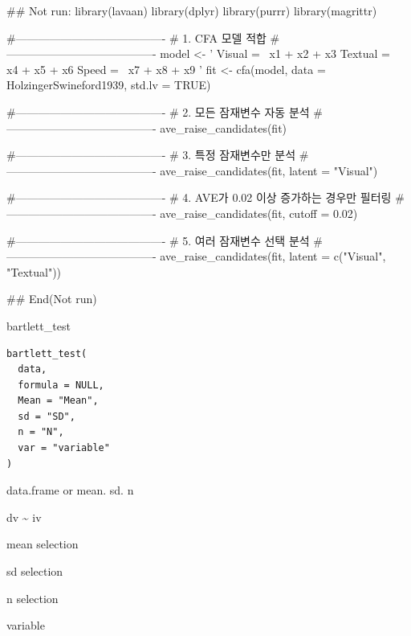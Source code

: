 \documentclass[a4paper]{book}
\begin{document}
\begin{Examples}
\begin{ExampleCode}
## Not run: 
library(lavaan)
library(dplyr)
library(purrr)
library(magrittr)

#----------------------------------------
# 1. CFA 모델 적합
#----------------------------------------
model <- '
  Visual  =~ x1 + x2 + x3
  Textual =~ x4 + x5 + x6
  Speed   =~ x7 + x8 + x9
'
fit <- cfa(model, data = HolzingerSwineford1939, std.lv = TRUE)

#----------------------------------------
# 2. 모든 잠재변수 자동 분석
#----------------------------------------
ave_raise_candidates(fit)

#----------------------------------------
# 3. 특정 잠재변수만 분석
#----------------------------------------
ave_raise_candidates(fit, latent = "Visual")

#----------------------------------------
# 4. AVE가 0.02 이상 증가하는 경우만 필터링
#----------------------------------------
ave_raise_candidates(fit, cutoff = 0.02)

#----------------------------------------
# 5. 여러 잠재변수 선택 분석
#----------------------------------------
ave_raise_candidates(fit, latent = c("Visual", "Textual"))

## End(Not run)
\end{ExampleCode}
\end{Examples}
%
\begin{Description}
bartlett\_test
\end{Description}
%
\begin{Usage}
\begin{verbatim}
bartlett_test(
  data,
  formula = NULL,
  Mean = "Mean",
  sd = "SD",
  n = "N",
  var = "variable"
)
\end{verbatim}
\end{Usage}
%
\begin{Arguments}
\begin{ldescription}
\item[\code{data}] data.frame or mean. sd. n

\item[\code{formula}] dv \textasciitilde{} iv

\item[\code{Mean}] mean selection

\item[\code{sd}] sd selection

\item[\code{n}] n selection

\item[\code{var}] variable
\end{ldescription}
\end{Arguments}
\end{document}
